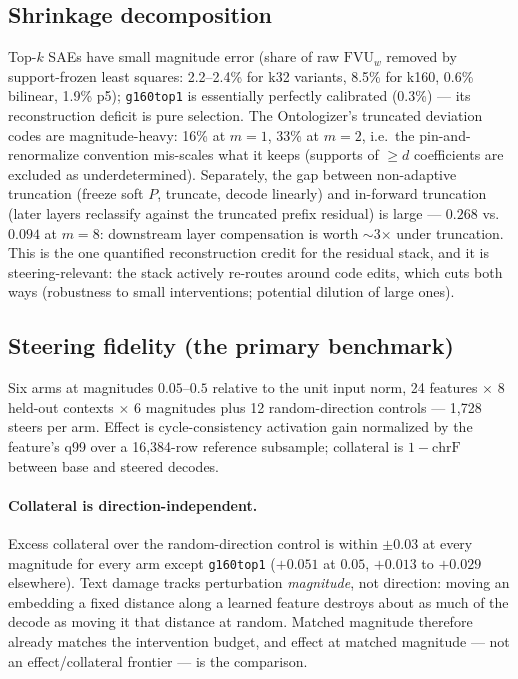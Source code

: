\documentclass[11pt]{article}
\newcommand{\fvu}{\mathrm{FVU}_w}
\begin{document}
\subsection{Shrinkage decomposition}

Top-$k$ SAEs have small magnitude error (share of raw $\fvu$ removed by
support-frozen least squares: 2.2--2.4\% for k32 variants, 8.5\% for
k160, 0.6\% bilinear, 1.9\% p5); \texttt{g160top1} is essentially
perfectly calibrated (0.3\%) --- its reconstruction deficit is pure
selection. The Ontologizer's truncated deviation codes are
magnitude-heavy: 16\% at $m{=}1$, 33\% at $m{=}2$, i.e.\ the
pin-and-renormalize convention mis-scales what it keeps (supports of
$\geq d$ coefficients are excluded as underdetermined). Separately, the
gap between non-adaptive truncation (freeze soft $P$, truncate, decode
linearly) and in-forward truncation (later layers reclassify against the
truncated prefix residual) is large --- $0.268$ vs.\ $0.094$ at $m{=}8$:
downstream layer compensation is worth $\sim$3$\times$ under truncation.
This is the one quantified reconstruction credit for the residual stack,
and it is steering-relevant: the stack actively re-routes around code
edits, which cuts both ways (robustness to small interventions;
potential dilution of large ones).

\subsection{Steering fidelity (the primary benchmark)}

Six arms at magnitudes $0.05$--$0.5$ relative to the unit input norm, 24
features $\times$ 8 held-out contexts $\times$ 6 magnitudes plus 12
random-direction controls --- 1{,}728 steers per arm. Effect is
cycle-consistency activation gain normalized by the feature's q99 over a
16{,}384-row reference subsample; collateral is $1-\mathrm{chrF}$ between
base and steered decodes.

\paragraph{Collateral is direction-independent.} Excess collateral over
the random-direction control is within $\pm0.03$ at every magnitude for
every arm except \texttt{g160top1} ($+0.051$ at $0.05$, $+0.013$ to
$+0.029$ elsewhere). Text damage tracks perturbation \emph{magnitude},
not direction: moving an embedding a fixed distance along a learned
feature destroys about as much of the decode as moving it that distance
at random. Matched magnitude therefore already matches the intervention
budget, and effect at matched magnitude --- not an effect/collateral
frontier --- is the comparison.
\end{document}
